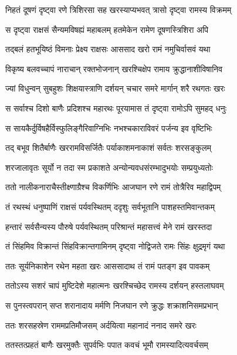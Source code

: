 
\twolineshloka
{निहतं दूषणं दृष्ट्वा रणे त्रिशिरसा सह}
{खरस्याप्यभवत् त्रासो दृष्ट्वा रामस्य विक्रमम्} %

\twolineshloka
{स दृष्ट्वा राक्षसं सैन्यमविषह्यं महाबलम्}
{हतमेकेन रामेण दूषणस्त्रिशिरा अपि} %

\twolineshloka
{तद्बलं हतभूयिष्ठं विमनाः प्रेक्ष्य राक्षसः}
{आससाद खरो रामं नमुचिर्वासवं यथा} %

\twolineshloka
{विकृष्य बलवच्चापं नाराचान् रक्तभोजनान्}
{खरश्चिक्षेप रामाय क्रुद्धानाशीविषानिव} %

\twolineshloka
{ज्यां विधुन्वन् सुबहुशः शिक्षयास्त्राणि दर्शयन्}
{चचार समरे मार्गान् शरै रथगतः खरः} %

\twolineshloka
{स सर्वाश्च दिशो बाणैः प्रदिशश्च महारथः}
{पूरयामास तं दृष्ट्वा रामोऽपि सुमहद् धनुः} %

\twolineshloka
{स सायकैर्दुर्विषहैर्विस्फुलिङ्गैरिवाग्निभिः}
{नभश्चकाराविवरं पर्जन्य इव वृष्टिभिः} %

\twolineshloka
{तद् बभूव शितैर्बाणैः खररामविसर्जितैः}
{पर्याकाशमनाकाशं सर्वतः शरसङ्कुलम्} %

\twolineshloka
{शरजालावृतः सूर्यो न तदा स्म प्रकाशते}
{अन्योन्यवधसंरम्भादुभयोः सम्प्रयुध्यतोः} %

\twolineshloka
{ततो नालीकनाराचैस्तीक्ष्णाग्रैश्च विकर्णिभिः}
{आजघान रणे रामं तोत्रैरिव महाद्विपम्} %

\twolineshloka
{तं रथस्थं धनुष्पाणिं राक्षसं पर्यवस्थितम्}
{ददृशुः सर्वभूतानि पाशहस्तमिवान्तकम्} %

\twolineshloka
{हन्तारं सर्वसैन्यस्य पौरुषे पर्यवस्थितम्}
{परिश्रान्तं महासत्त्वं मेने रामं खरस्तदा} %

\twolineshloka
{तं सिंहमिव विक्रान्तं सिंहविक्रान्तगामिनम्}
{दृष्ट्वा नोद्विजते रामः सिंहः क्षुद्रमृगं यथा} %

\twolineshloka
{ततः सूर्यनिकाशेन रथेन महता खरः}
{आससादाथ तं रामं पतङ्ग इव पावकम्} %

\twolineshloka
{ततोऽस्य सशरं चापं मुष्टिदेशे महात्मनः}
{खरश्चिच्छेद रामस्य दर्शयन् हस्तलाघवम्} %

\twolineshloka
{स पुनस्त्वपरान् सप्त शरानादाय मर्मणि}
{निजघान रणे क्रुद्धः शक्राशनिसमप्रभान्} %

\twolineshloka
{ततः शरसहस्रेण राममप्रतिमौजसम्}
{अर्दयित्वा महानादं ननाद समरे खरः} %

\twolineshloka
{ततस्तत्प्रहतं बाणैः खरमुक्तैः सुपर्वभिः}
{पपात कवचं भूमौ रामस्यादित्यवर्चसम्} %

